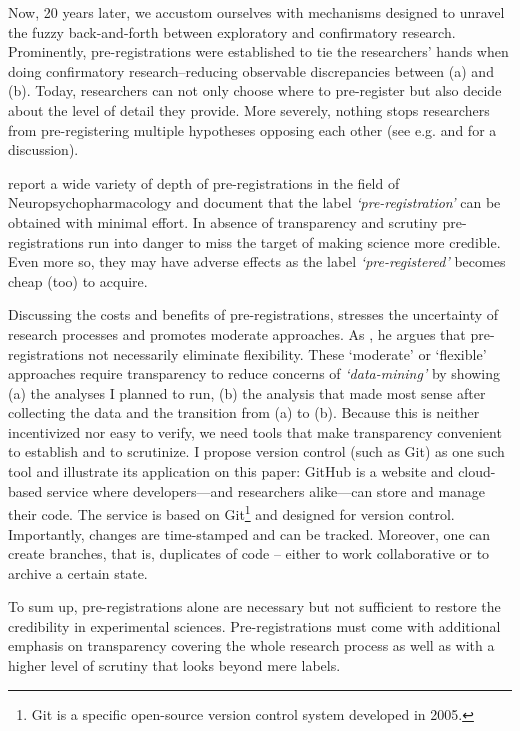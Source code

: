 \documentclass[
  authoryear,
  preprint,
  3p]{elsarticle}
\begin{document}
Now, 20 years later, we accustom ourselves with mechanisms designed to
unravel the fuzzy back-and-forth between exploratory and confirmatory
research. Prominently, pre-registrations were established to tie the
researchers' hands when doing confirmatory research--reducing observable
discrepancies between (a) and (b). Today, researchers can not only
choose where to pre-register but also decide about the level of detail
they provide. More severely, nothing stops researchers from
pre-registering multiple hypotheses opposing each other (see e.g.
\citet{SimmonsEtAl2021} and \citet{PhamEtAl2021} for a discussion).

\citet{WaldronAllen2022} report a wide variety of depth of
pre-registrations in the field of Neuropsychopharmacology and document
that the label \emph{`pre-registration'} can be obtained with minimal
effort. In absence of transparency and scrutiny pre-registrations run
into danger to miss the target of making science more credible. Even
more so, they may have adverse effects as the label
\emph{`pre-registered'} becomes cheap (too) to acquire.

Discussing the costs and benefits of pre-registrations,
\citet{Olken2015} stresses the uncertainty of research processes and
promotes moderate approaches. As \citet{WaldronAllen2022}, he argues
that pre-registrations not necessarily eliminate flexibility. These
`moderate' or `flexible' approaches require transparency to reduce
concerns of \emph{`data-mining'} \citep[ p.~61]{Olken2015} by showing
(a) the analyses I planned to run, (b) the analysis that made most sense
after collecting the data and the transition from (a) to (b). Because
this is neither incentivized nor easy to verify, we need tools that make
transparency convenient to establish and to scrutinize. I propose
version control (such as Git) as one such tool and illustrate its
application on this paper: GitHub is a website and cloud-based service
where developers---and researchers alike---can store and manage their
code. The service is based on Git\footnote{Git is a specific open-source
  version control system developed in 2005.} and designed for version
control. Importantly, changes are time-stamped and can be tracked.
Moreover, one can create branches, that is, duplicates of code -- either
to work collaborative or to archive a certain state.

To sum up, pre-registrations alone are necessary but not sufficient to
restore the credibility in experimental sciences. Pre-registrations must
come with additional emphasis on transparency covering the whole
research process as well as with a higher level of scrutiny that looks
beyond mere labels.
\end{document}
